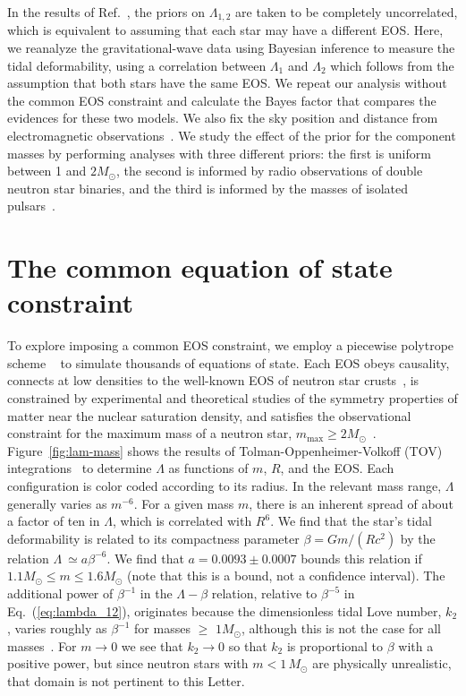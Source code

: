 In the results of Ref.~\cite{TheLIGOScientific:2017qsa},
the priors on $\Lambda_{1,2}$ are taken to be completely uncorrelated,
which is equivalent to assuming that each star may have a different
EOS. Here, we reanalyze the gravitational-wave data using Bayesian
inference \cite{Biwer:2018osg,alex_nitz_2018_1208115,emcee} to measure the tidal deformability, using a
correlation between $\Lambda_1$ and $\Lambda_2$ which follows from the
assumption that both stars have the same EOS.  We repeat
our analysis without the common EOS constraint and calculate the 
Bayes factor that compares the evidences for these two models.
We also fix the sky position and
distance from electromagnetic observations~\cite{Soares-Santos:2017lru,Cantiello:2018ffy}.
We study the effect of
the prior for the component masses by performing analyses with three
different priors: the first is uniform between 1 and $2M_\odot$, the
second is informed by radio observations of double neutron star
binaries, and the third is informed by the masses of isolated pulsars~\cite{Ozel:2016oaf}.

\section{The common equation of state constraint}\label{sec:ceos_constraint}

To explore imposing a common EOS constraint, we employ a piecewise polytrope scheme ~\cite{Lattimer:2015nhk} to simulate thousands of equations of state.  Each EOS obeys causality, connects at low densities to the well-known EOS of neutron star crusts~\cite{Lattimer:2012nd}, is constrained by experimental and theoretical studies of the symmetry properties of matter near the nuclear saturation density, and satisfies the observational constraint for the maximum mass of a neutron star, $m_\mathrm{max}\ge2M_\odot$~\cite{Antoniadis:2013pzd}. Figure~\ref{fig:lam-mass} shows the results of Tolman-Oppenheimer-Volkoff (TOV) integrations~\cite{Oppenheimer:1939ne,Postnikov:2010yn} to determine $\Lambda$ as functions of $m$, $R$, and the EOS. Each configuration is color coded according to its
radius. In the relevant mass range, $\Lambda$ generally varies as
$m^{-6}$. For a given mass $m$, there is an inherent spread of about a factor of ten in $\Lambda$, which is correlated with $R^6$. We find that the star's tidal deformability is related to its compactness parameter 
$\beta=Gm/(Rc^2)$ by the relation $\Lambda~\simeq a\beta^{-6}$. We find that $a=0.0093\pm0.0007$ bounds this relation if $1.1M_\odot\le m\le1.6M_\odot$
(note that this is a bound, not a confidence interval). The additional power of $\beta^{-1}$ in the $\Lambda-\beta$ relation, relative to $\beta^{-5}$ in Eq.~(\ref{eq:lambda_12}), originates because the dimensionless tidal Love number, $k_2$, varies roughly as $\beta^{-1}$ for masses $\geq$
$1M_\odot$, although this is not the case for all masses~\cite{Postnikov:2010yn}. For $m\to0$ we see that $k_2\to0$ so that $k_2$ is proportional to $\beta$ with a positive power, but since neutron stars with $m < 1\,M_\odot$ are physically unrealistic, that domain is not pertinent to this Letter.

